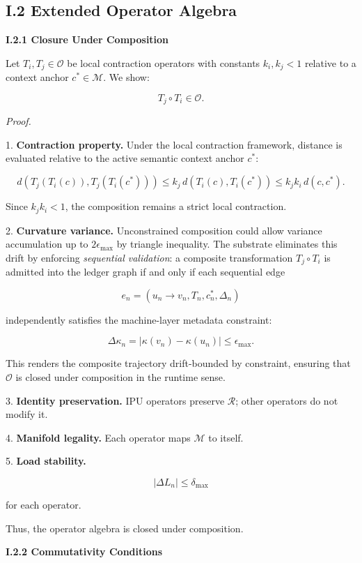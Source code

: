 \subsection*{I.2 Extended Operator Algebra}

\textbf{I.2.1 Closure Under Composition}

Let $T_i, T_j \in \mathcal{O}$ be local contraction operators with constants
$k_i, k_j < 1$ relative to a context anchor $c^* \in \mathcal{M}$. We show:


\[
T_j \circ T_i \in \mathcal{O}.
\]



\textit{Proof.}

1. \textbf{Contraction property.}
Under the local contraction framework, distance is evaluated relative to the
active semantic context anchor $c^*$:


\[
d(T_j(T_i(c)), T_j(T_i(c^*)))
\le k_j \, d(T_i(c), T_i(c^*))
\le k_j k_i \, d(c, c^*).
\]


Since $k_j k_i < 1$, the composition remains a strict local contraction.

2. \textbf{Curvature variance.}
Unconstrained composition could allow variance accumulation up to
$2\epsilon_{\max}$ by triangle inequality. The substrate eliminates this drift
by enforcing \emph{sequential validation}: a composite transformation
$T_j \circ T_i$ is admitted into the ledger graph if and only if each
sequential edge


\[
e_n = (u_n \rightarrow v_n, T_n, c^*_n, \Delta_n)
\]


independently satisfies the machine-layer metadata constraint:


\[
\Delta \kappa_n = |\kappa(v_n) - \kappa(u_n)| \le \epsilon_{\max}.
\]


This renders the composite trajectory drift-bounded by constraint, ensuring
that $\mathcal{O}$ is closed under composition in the runtime sense.

3. \textbf{Identity preservation.}
IPU operators preserve $\mathcal{R}$; other operators do not modify it.

4. \textbf{Manifold legality.}
Each operator maps $\mathcal{M}$ to itself.

5. \textbf{Load stability.}


\[
|\Delta L_n| \le \delta_{\max}
\]


for each operator.

Thus, the operator algebra is closed under composition.

\textbf{I.2.2 Commutativity Conditions}

